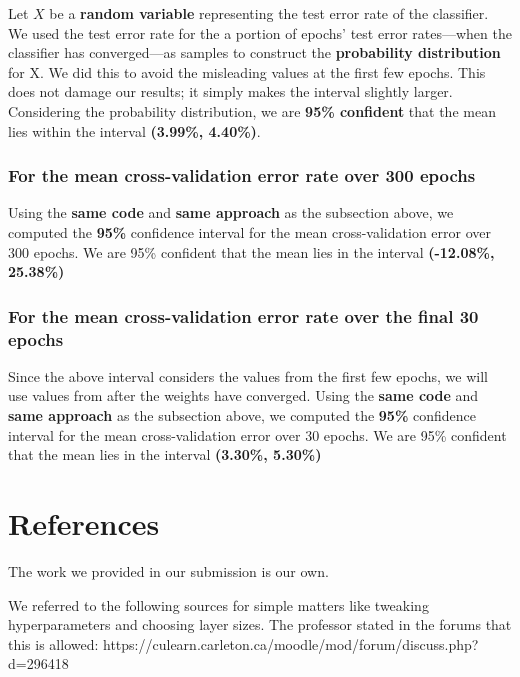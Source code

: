 \documentclass[11pt]{article}
\begin{document}
    Let \(X\) be a \textbf{random variable} representing the test error rate
of the classifier. We used the test error rate for the a portion of
epochs' test error rates---when the classifier has
converged---as samples to construct the \textbf{probability
distribution} for X. We did this to avoid the misleading values at the
first few epochs. This does not damage our results; it simply makes the
interval slightly larger. Considering the probability distribution, we
are \textbf{95\% confident} that the mean lies within the interval
\textbf{(3.99\%, 4.40\%)}.

\subsubsection{For the mean cross-validation error rate over 300
epochs}\label{for-the-mean-cross-validation-error-rate-over-300-folds}

Using the \textbf{same code} and \textbf{same approach} as the
subsection above, we computed the \textbf{95\%} confidence interval for
the mean cross-validation error over 300 epochs. We are 95\% confident
that the mean lies in the interval \textbf{(-12.08\%, 25.38\%)}

\subsubsection{For the mean cross-validation error rate over the final 30
epochs}\label{for-the-mean-cross-validation-error-rate-over-the-final-30-folds}

Since the above interval considers the values from the first few epochs,
we will use values from after the weights have converged. Using the
\textbf{same code} and \textbf{same approach} as the subsection above,
we computed the \textbf{95\%} confidence interval for the mean
cross-validation error over 30 epochs. We are 95\% confident that the
mean lies in the interval \textbf{(3.30\%, 5.30\%)}



\section{References}\label{references}

The work we provided in our submission is our own.

We referred to the following sources for simple matters like tweaking
hyperparameters and choosing layer sizes. The professor stated in the
forums that this is allowed:
https://culearn.carleton.ca/moodle/mod/forum/discuss.php?d=296418
\end{document}
